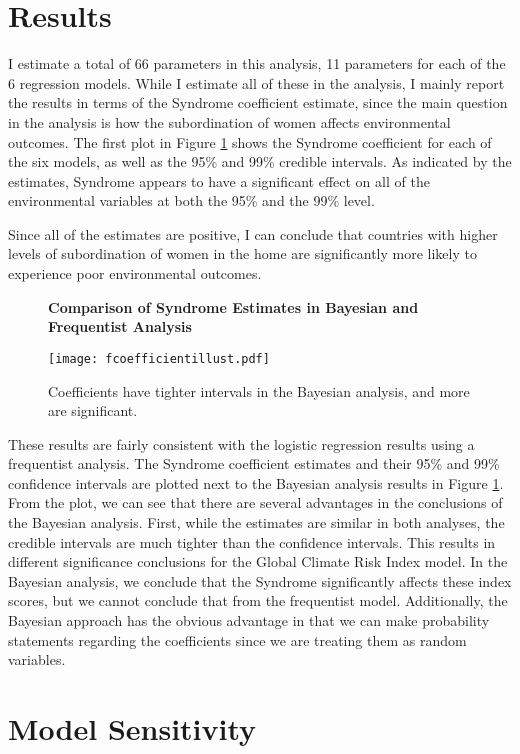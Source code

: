 \documentclass[letterpaper,10.5pt]{article}
\begin{document}
\section{Results}

I estimate a total of 66 parameters in this analysis, 11 parameters for each of the 6 regression models. While I estimate all of these in the analysis, I mainly report the results in terms of the Syndrome coefficient estimate, since the main question in the analysis is how the subordination of women affects environmental outcomes. The first plot in Figure \ref{SynCoefEst} shows the Syndrome coefficient for each of the six models, as well as the 95\% and 99\% credible intervals. As indicated by the estimates, Syndrome appears to have a significant effect on all of the environmental variables at both the 95\% and the 99\% level. 

Since all of the estimates are positive, I can conclude that countries with higher levels of subordination of women in the home are significantly more likely to experience poor environmental outcomes. 

\begin{figure}
\centering
\textbf{Comparison of Syndrome Estimates in Bayesian and Frequentist Analysis}\par\medskip
\centering
  \texttt{[image: fcoefficientillust.pdf]}
  \caption{Coefficients have tighter intervals in the Bayesian analysis, and more are significant.}
  \label{SynCoefEst}
\end{figure}

These results are fairly consistent with the logistic regression results using a frequentist analysis. The Syndrome coefficient estimates and their 95\% and 99\% confidence intervals are plotted next to the Bayesian analysis results in Figure \ref{SynCoefEst}. From the plot, we can see that there are several advantages in the conclusions of the Bayesian analysis. First, while the estimates are similar in both analyses, the credible intervals are much tighter than the confidence intervals. This results in different significance conclusions for the Global Climate Risk Index model. In the Bayesian analysis, we conclude that the Syndrome significantly affects these index scores, but we cannot conclude that from the frequentist model. Additionally, the Bayesian approach has the obvious advantage in that we can make probability statements regarding the coefficients since we are treating them as random variables.

\section{Model Sensitivity}
\end{document}
